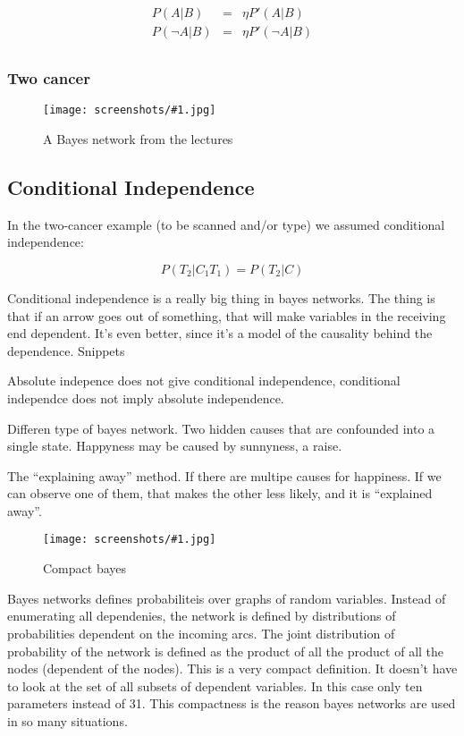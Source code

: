 \documentclass[a4, 12pt, english, USenglish]{scrreprt}
\newcommand{\screenshot}[2]{
\begin{figure}[htb]
\texttt{[image: screenshots/\#1.jpg]}
\label{#1}
\caption{#2}
\end{figure}}
\begin{document}
\[
\begin{array}{lcl}
 P(A|B)&=&  \eta P'(A|B)  \\
 P(\neg A|B) &=& \eta P'(\neg A|B)\\
\end{array}
\]


\subsubsection{Two cancer}

\screenshot{twocancer}{A Bayes network from the lectures}



\subsection{Conditional Independence}

In the two-cancer example (to be scanned and/or type) we assumed
conditional independence:

\[
P(T_2| C_1T_1) = P(T_2| C) 
\]


Conditional independence is a really big thing in bayes networks.
The thing is that if an arrow goes out of something, that will make
variables in the receiving end dependent.  It's even better, since
it's a model of the causality behind the dependence.
Snippets


Absolute indepence does not give conditional independence, conditional
independce does not imply absolute independence.

Differen type of bayes network.  Two hidden causes that are confounded
into a single state.  Happyness may be caused by sunnyness, a raise.

The ``explaining away'' method.  If there are multipe causes for
happiness.  If we can observe one of them, that makes the other less
likely, and it is ``explained away''.

\screenshot{compactbayes}{Compact bayes}


Bayes networks defines probabiliteis over graphs of random variables.
Instead of enumerating all dependenies, the network is defined by
distributions of probabilities dependent on the incoming arcs.  The
joint distribution of probability of the network is defined as the
product of all the product of all the nodes (dependent of the nodes).
This is a very compact definition.  It doesn't have to look at the set
of all subsets of dependent variables.   In this case only ten
parameters instead of 31.  This compactness is the reason bayes
networks are used in so many situations.
\end{document}
